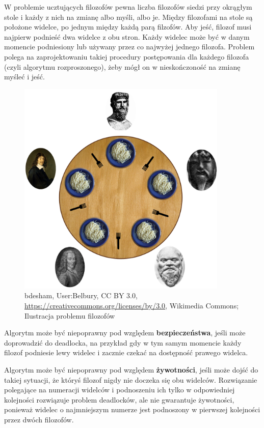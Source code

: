 W problemie ucztujących filozofów pewna liczba filozofów siedzi przy okrągłym stole i każdy z nich na zmianę albo myśli, albo je. Między filozofami na stole są położone widelce, po jednym między każdą parą filzofów. Aby jeść, filozof musi najpierw podnieść dwa widelce z obu stron. Każdy widelec może być w danym momencie podniesiony lub używany przez co najwyżej jednego filozofa. Problem polega na zaprojektowaniu takiej procedury postępowania dla każdego filozofa (czyli algorytmu rozproszonego), żeby mógł on w nieskończoność na zmianę myśleć i jeść.

\begin{figure}[H]
	\centering
	\includegraphics[width=10cm]{chapters/sysopy/filozofowie/An_illustration_of_the_dining_philosophers_problem.png}
	\caption{bdesham, User:Belbury, CC BY 3.0, \url{https://creativecommons.org/licenses/by/3.0}, Wikimedia Commons; Ilustracja problemu filozofów}
\end{figure}

Algorytm może być niepoprawny pod względem \textbf{bezpieczeństwa}, jeśli może doprowadzić do deadlocka, na przykład gdy w tym samym momencie każdy filozof podniesie lewy widelec i zacznie czekać na dostępność prawego widelca.

Algorytm może być niepoprawny pod względem \textbf{żywotności}, jeśli może dojść do takiej sytuacji, że któryś filozof nigdy nie doczeka się obu widelców. Rozwiązanie polegające na numeracji widelców i podnoszeniu ich tylko w odpowiedniej kolejności rozwiązuje problem deadlocków, ale nie gwarantuje żywotności, ponieważ widelec o najmniejszym numerze jest podnoszony w pierwszej kolejności przez dwóch filozofów.

